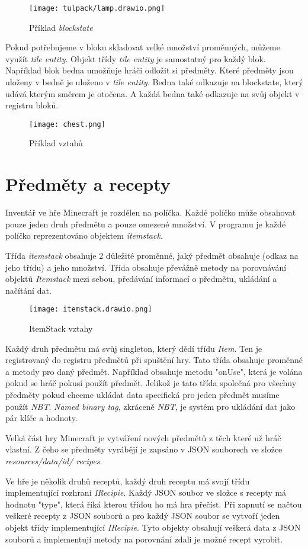 \documentclass[FM,Proj,bw]{tulthesis}
\begin{document}
\begin{figure}[h]
    \centering
    \texttt{[image: tulpack/lamp.drawio.png]}
    \caption{Příklad \textit{blockstate}}
    \label{Příklad blocstate}
\end{figure}

\par Pokud potřebujeme v bloku skladovat velké množství proměnných, můžeme využít \textit{tile entity}. Objekt třídy \textit{tile entity} je samostatný pro každý blok.
Například blok bedna umožňuje hráči odložit si předměty. Které předměty jsou uloženy v bedně je uloženo v \textit{tile entity}. Bedna také odkazuje na blockstate, který udává kterým směrem je otočena. A každá bedna také odkazuje na svůj objekt v registru bloků. 
\begin{figure}[h]
    \centering
    \texttt{[image: chest.png]}
    \caption{Příklad vztahů}
    \label{Příklad vztahů}
\end{figure}

\section{Předměty a recepty}
Inventář ve hře Minecraft je rozdělen na políčka. Každé políčko může obsahovat pouze jeden druh předmětu a pouze omezené množství. V programu je každé políčko reprezentováno objektem \textit{itemstack}. 
\par Třída \textit{itemstack}  obsahuje 2 důležité proměnné, jaký předmět obsahuje (odkaz na jeho třídu) a jeho množství. Třída obsahuje převážně metody na porovnávání objektů \textit{Itemstack} mezi sebou, předávání informací o předmětu, ukládání a načítání dat.
\begin{figure}[h]
    \centering
    \texttt{[image: itemstack.drawio.png]}
    \caption{ItemStack vztahy}
    \label{ItemStack vztahy}
\end{figure}
\par Každý druh předmětu má svůj singleton, který dědí třídu \textit{Item}. Ten je registrovaný do registru předmětů při spuštění hry. Tato třída obsahuje proměnné a metody pro daný předmět. Například obsahuje metodu "onUse", která je volána pokud se hráč pokusí použít předmět. Jelikož je tato třída společná pro všechny předměty pokud chceme ukládat data specifická pro jeden předmět musíme použít \textit{NBT}. \textit{Named binary tag}, zkráceně \textit{NBT},  je systém pro ukládání dat jako pár klíče a hodnoty.
\par Velká část hry  Minecraft je vytváření nových předmětů z těch které už hráč vlastní. Z čeho se předměty vyrábějí je zapsáno v JSON souborech ve složce \textit{resources/data/id/ recipes}.
\par Ve hře je několik druhů receptů, každý druh receptu má svojí třídu implementující rozhraní \textit{IRecipie}. Každý JSON soubor ve složce s recepty má hodnotu "type", která říká kterou třídou ho má hra přečíst. Při zapnutí se načtou veškeré recepty z JSON souborů a pro každý JSON soubor se vytvoří jeden objekt třídy implementující \textit{IRecipie}. Tyto objekty obsahují veškerá data z JSON souborů a implementují metody na porovnání zdali je možné recept vyrobit.    
\end{document}
